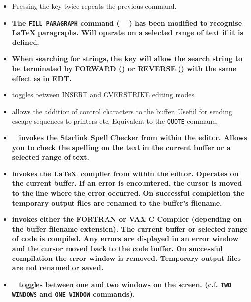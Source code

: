\begin{itemize}
\item Pressing the  key twice repeats the previous command.

\item {\bf The {\tt FILL PARAGRAPH} command ( \gold\  ) has been
      modified to recognise {\LaTeX} paragraphs. Will operate on a selected
      range of text if it is defined.}

\item {\bf When searching for strings, the  key will allow the
      search string to be terminated by FORWARD () or REVERSE
      () with the same effect as in EDT.}

\item {} toggles between INSERT and OVERSTRIKE editing modes

\item {}  allows the addition of control characters to 
      the buffer.
      Useful for sending escape sequences to printers etc. Equivalent to
      the {\tt QUOTE} command.

\item {\bf \gold\  invokes the Starlink Spell Checker from within 
      the editor.
      Allows you to check the spelling on the text in the current buffer or a
      selected range of text.}

\item {\bf {}  invokes the \LaTeX\ compiler from within
      the editor.
      Operates on the current buffer. If an error is encountered, the cursor is
      moved to the line where the error occurred. On successful completion the
      temporary output files are renamed to the buffer's filename.}

\item {\bf {}  invokes either the FORTRAN or VAX C
       Compiler (depending on the buffer filename extension). The current
       buffer or selected range of code is compiled. Any errors are displayed
       in an error window and the cursor moved back to the code buffer. On
       successful compilation the error window is removed. Temporary output
      files are not renamed or saved.}

\item {\bf \gold\ \keyname{=} toggles between one and two windows on the screen.
      (c.f. {\tt TWO WINDOWS} and {\tt ONE WINDOW} commands). }


\end{itemize}
